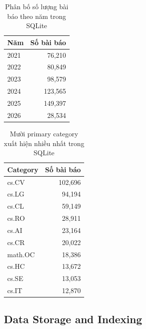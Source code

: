 \documentclass[conference]{IEEEtran}
\begin{document}
\begin{table}[t]
\caption{Phân bố số lượng bài báo theo năm trong SQLite}
\label{tab:year-dist}
\centering
\begin{tabular}{lr}
\toprule
\textbf{Năm} & \textbf{Số bài báo}\\
\midrule
2021 & 76,210\\
2022 & 80,849\\
2023 & 98,579\\
2024 & 123,565\\
2025 & 149,397\\
2026 & 28,534\\
\bottomrule
\end{tabular}
\end{table}

\begin{table}[t]
\caption{Mười primary category xuất hiện nhiều nhất trong SQLite}
\label{tab:top-categories}
\centering
\begin{tabular}{lr}
\toprule
\textbf{Category} & \textbf{Số bài báo}\\
\midrule
cs.CV & 102,696\\
cs.LG & 94,194\\
cs.CL & 59,149\\
cs.RO & 28,911\\
cs.AI & 23,164\\
cs.CR & 20,022\\
math.OC & 18,386\\
cs.HC & 13,672\\
cs.SE & 13,053\\
cs.IT & 12,870\\
\bottomrule
\end{tabular}
\end{table}

\subsection{Data Storage and Indexing}
\end{document}
